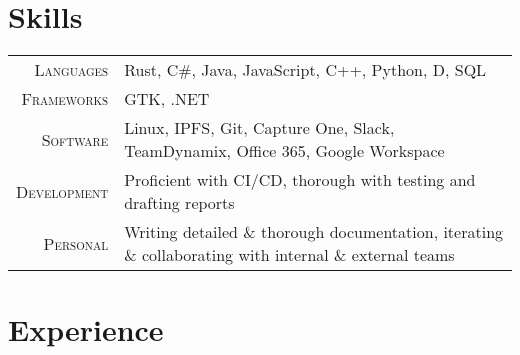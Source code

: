 \documentclass[letterpaper,8pt]{article} %
\begin{document}

\section{Skills}

\footnotesize{\begin{tabular}{rl}
\textsc{Languages} & Rust, C\#, Java, JavaScript, C++, Python, D, SQL\\
\textsc{Frameworks} & GTK, .NET\\
\textsc{Software} & Linux, IPFS, Git, Capture One, Slack, TeamDynamix, Office 365, Google Workspace\\
\textsc{Development} & Proficient with CI/CD, thorough with testing and drafting reports\\
\textsc{Personal} & Writing detailed \& thorough documentation, iterating \& collaborating with internal \& external teams

\end{tabular}}\normalsize


\section{Experience}
\end{document}
